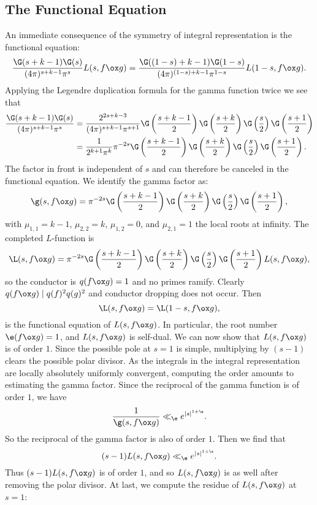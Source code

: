     \subsection*{The Functional Equation}
      An immediate consequence of the symmetry of integral representation is the functional equation:
      \[
        \frac{\G(s+k-1)\G(s)}{(4\pi)^{s+k-1}\pi^{s}}L(s,f \ox g) = \frac{\G((1-s)+k-1)\G(1-s)}{(4\pi)^{(1-s)+k-1}\pi^{1-s}}L(1-s,f \ox g).
      \]
      Applying the Legendre duplication formula for the gamma function twice we see that
      \begin{equation}\label{equ:duplication_for_Rankin-Selberg_gamma_factor}
        \begin{aligned}
          \frac{\G(s+k-1)\G(s)}{(4\pi)^{s+k-1}\pi^{s}} &= \frac{2^{2s+k-3}}{(4\pi)^{s+k-1}\pi^{s+1}}\G\left(\frac{s+k-1}{2}\right)\G\left(\frac{s+k}{2}\right)\G\left(\frac{s}{2}\right)\G\left(\frac{s+1}{2}\right) \\
          &= \frac{1}{2^{k+1}\pi^{k}}\pi^{-2s}\G\left(\frac{s+k-1}{2}\right)\G\left(\frac{s+k}{2}\right)\G\left(\frac{s}{2}\right)\G\left(\frac{s+1}{2}\right).
        \end{aligned}
      \end{equation}
      The factor in front is independent of $s$ and can therefore be canceled in the functional equation. We identify the gamma factor as:
      \[
        \g(s,f \ox g) = \pi^{-2s}\G\left(\frac{s+k-1}{2}\right)\G\left(\frac{s+k}{2}\right)\G\left(\frac{s}{2}\right)\G\left(\frac{s+1}{2}\right),
      \]
      with $\mu_{1,1} = k-1$, $\mu_{2,2} = k$, $\mu_{1,2} = 0$, and $\mu_{2,1} = 1$ the local roots at infinity. The completed $L$-function is
      \[
        \L(s,f \ox g) = \pi^{-2s}\G\left(\frac{s+k-1}{2}\right)\G\left(\frac{s+k}{2}\right)\G\left(\frac{s}{2}\right)\G\left(\frac{s+1}{2}\right)L(s,f \ox g),
      \]
      so the conductor is $q(f \ox g) = 1$ and no primes ramify. Clearly $q(f \ox g) \mid q(f)^{2}q(g)^{2}$ and conductor dropping does not occur. Then
      \[
        \L(s,f \ox g) = \L(1-s,f \ox g),
      \]
      is the functional equation of $L(s,f \ox g)$. In particular, the root number $\e(f \ox g) = 1$, and $L(s,f \ox g)$ is self-dual. We can now show that $L(s,f \ox g)$ is of order $1$. Since the possible pole at $s = 1$ is simple, multiplying by $(s-1)$ clears the possible polar divisor. As the integrals in the integral representation are locally absolutely uniformly convergent, computing the order amounts to estimating the gamma factor. Since the reciprocal of the gamma function is of order $1$, we have
      \[
        \frac{1}{\g(s,f \ox g)} \ll_{\e} e^{|s|^{1+\e}}.
      \]
      So the reciprocal of the gamma factor is also of order $1$. Then we find that
      \[
        (s-1)L(s,f \ox g) \ll_{\e} e^{|s|^{1+\e}}.
      \]
      Thus $(s-1)L(s,f \ox g)$ is of order $1$, and so $L(s,f \ox g)$ is as well after removing the polar divisor. At last, we compute the residue of $L(s,f \ox g)$ at $s = 1$:

